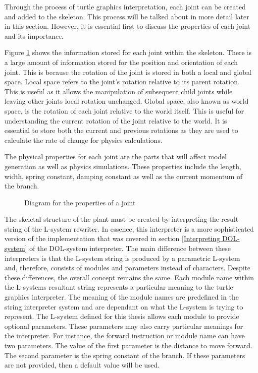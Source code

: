 \noindent
Through the process of turtle graphics interpretation, each joint can be created and added to the skeleton. This process will be talked about in more detail later in this section. However, it is essential first to discuss the properties of each joint and its importance.

Figure \ref{joint properties} shows the information stored for each joint within the skeleton. There is a large amount of information stored for the position and orientation of each joint. This is because the rotation of the joint is stored in both a local and global space. Local space refers to the joint's rotation relative to its parent rotation. This is useful as it allows the manipulation of subsequent child joints while leaving other joints local rotation unchanged. Global space, also known as world space, is the rotation of each joint relative to the world itself. This is useful for understanding the current rotation of the joint relative to the world. It is essential to store both the current and previous rotations as they are used to calculate the rate of change for physics calculations.

The physical properties for each joint are the parts that will affect model generation as well as physics simulations. These properties include the length, width, spring constant, damping constant as well as the current momentum of the branch.

\begin{figure}[htbp]
	{\centering
		\vspace{7px}
		\setlength{\fboxrule}{1pt}
		\caption{Diagram for the properties of a joint} \label{joint properties}
	}
\end{figure}
\FloatBarrier

\noindent
The skeletal structure of the plant must be created by interpreting the result string of the L-system rewriter. In essence, this interpreter is a more sophisticated version of the implementation that was covered in section \ref{Interpreting DOL-system} of the DOL-system interpreter. The main difference between these interpreters is that the L-system string is produced by a parametric L-system and, therefore, consists of modules and parameters instead of characters. Despite these differences, the overall concept remains the same. Each module name within the L-systems resultant string represents a particular meaning to the turtle graphics interpreter. The meaning of the module names are predefined in the string interpreter system and are dependant on what the L-system is trying to represent. The L-system defined for this thesis allows each module to provide optional parameters. These parameters may also carry particular meanings for the interpreter. For instance, the forward instruction or module name  can have two parameters. The value of the first parameter is the distance to move forward. The second parameter is the spring constant of the branch. If these parameters are not provided, then a default value will be used. 

